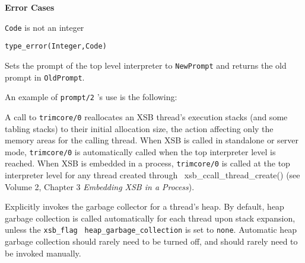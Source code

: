 \begin{description}
{\bf Error Cases}
\bi
\item 	{\tt Code} is not an integer
\bi
\item 	{\tt type\_error(Integer,Code)}
\ei
\ei

    Sets the prompt of the top level interpreter to {\tt NewPrompt} and 
    returns the old prompt in {\tt OldPrompt}.

    An example of {\tt prompt/2} 's use is the following:


%
A call to {\tt trimcore/0} reallocates an XSB thread's execution
stacks (and some tabling stacks) to their initial allocation size, the
action affecting only the memory areas for the calling thread.  When
XSB is called in standalone or server mode, {\tt trimcore/0} is
automatically called when the top interpreter level is reached.  When
XSB is embedded in a process, {\tt trimcore/0} is called at the top
interpreter level for any thread created through
{\ xsb\_ccall\_thread\_create()} (see Volume 2, Chapter 3 {\em
  Embedding XSB in a Process}).

%
Explicitly invokes the garbage collector for a thread's heap. By
default, heap garbage collection is called automatically for each
thread upon stack expansion, unless the {\tt xsb\_flag} {\tt
  heap\_garbage\_collection} is set to {\tt none}.  Automatic heap
garbage collection should rarely need to be turned off, and should
rarely need to be invoked manually.

 

\end{description}
